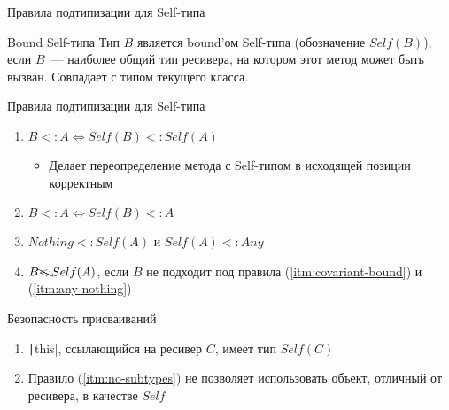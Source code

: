 \documentclass[aspectratio=169,usenames,dvipsnames]{beamer}
\begin{document}
    \begin{frame}[fragile]{Правила подтипизации для Self-типа}

        \begin{block}{Bound Self-типа}
            Тип $B$ является bound'ом Self-типа (обозначение \underline{$Self(B)$}), если $B$~--- наиболее общий тип ресивера, на котором этот метод может быть вызван.
            Совпадает с типом текущего класса.
        \end{block}

        \pause

        \begin{block}{Правила подтипизации для Self-типа}
            \begin{enumerate}
                \item \label{itm:covariant-bound} $B <: A \iff Self(B) <: Self(A)$
                \begin{itemize}
                    \item Делает переопределение метода с Self-типом в исходящей позиции корректным
                \end{itemize}
                \item \label{itm:this-subtype} $B <: A \iff Self(B) <: A$
                \item \label{itm:any-nothing} $Nothing <: Self(A)$ и $Self(A) <: Any$
                \item \label{itm:no-subtypes} $B \bcancel{<:} Self(A)$, если $B$ не подходит под правила (\ref{itm:covariant-bound}) и (\ref{itm:any-nothing})
            \end{enumerate}
        \end{block}

        \pause

        \begin{block}{Безопасность присваиваний}
            \begin{enumerate}
                \item \texttt|this|, ссылающийся на ресивер $C$, имеет тип $Self(C)$
                \item Правило (\ref{itm:no-subtypes}) не позволяет использовать объект, отличный от ресивера, в качестве $Self$
            \end{enumerate}
        \end{block}
    \end{frame}
\end{document}
